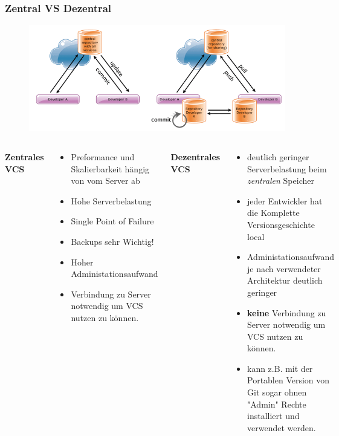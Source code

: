 \documentclass{beamer}
\begin{document}
\begin{frame}
\begin{columns}
\end{columns}
\end{frame}

\begin{frame}\frametitle{Zentral VS Dezentral}
\begin{figure}
\includegraphics[scale=.4]{Bilder/centralVSdecentral}
\end{figure}
\begin{columns}
        \textbf{Zentrales VCS}
\begin{tiny}
\begin{itemize}
\item Preformance und Skalierbarkeit hängig von vom Server ab
\item Hohe Serverbelastung
\item Single Point of Failure
\item Backups sehr Wichtig!
\item Hoher Administationsaufwand
\item Verbindung zu Server notwendig um VCS nutzen zu können.
\end{itemize}
\end{tiny}
        \textbf{Dezentrales VCS}
\begin{tiny}
        \begin{itemize}
\item deutlich geringer Serverbelastung beim \textit{zentralen} Speicher
\item jeder Entwickler hat die Komplette Versionsgeschichte local
\item Administationsaufwand je nach verwendeter Architektur deutlich geringer
\item \textbf{keine }Verbindung zu Server notwendig um VCS nutzen zu können.
\item kann z.B. mit der Portablen Version von Git sogar ohnen "Admin" Rechte installiert und verwendet werden.
\end{itemize}
\end{tiny}
\end{columns}
\end{frame}
\end{document}
